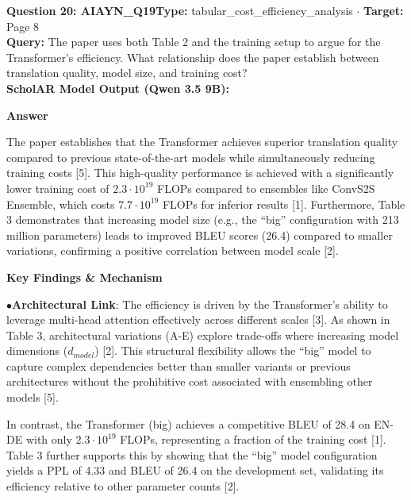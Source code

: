 \documentclass[10pt,a4paper]{article}
\begin{document}
\begin{tcolorbox}[questionbox]
{\noindent\bfseries\large\color{navy} Question 20: AIAYN\_Q19}\hfill {\footnotesize\color{darkteal}\textbf{Type:} tabular\_cost\_efficiency\_analysis $\cdot$ \textbf{Target:} Page 8}\\[4pt]
{\noindent\bfseries\color{accentblue} Query: } The paper uses both Table 2 and the training setup to argue for the Transformer's efficiency. What relationship does the paper establish between translation quality, model size, and training cost?\\[6pt]
{\noindent\bfseries\color{navy} ScholAR Model Output (Qwen 3.5 9B):}\\[2pt]
{\small \noindent \textbf{Answer}\par\vspace{3pt}The paper establishes that the Transformer achieves superior translation quality compared to previous state-of-the-art models while simultaneously reducing training costs [5].  This high-quality performance is achieved with a significantly lower training cost of $2.3 \cdot 10^{19}$ FLOPs compared to ensembles like ConvS2S Ensemble, which costs $7.7 \cdot 10^{19}$ FLOPs for inferior results [1]. Furthermore, Table 3 demonstrates that increasing model size (e.g., the ``big'' configuration with 213 million parameters) leads to improved BLEU scores (26.4) compared to smaller variations, confirming a positive correlation between model scale [2].\par\vspace{3pt}\noindent \textbf{Key Findings \& Mechanism}\par\vspace{3pt}\noindent\hspace*{8pt}$\bullet$\hspace*{4pt}\textbf{Architectural Link}: The efficiency is driven by the Transformer's ability to leverage multi-head attention effectively across different scales [3]. As shown in Table 3, architectural variations (A-E) explore trade-offs where increasing model dimensions ($d_{model}$) [2]. This structural flexibility allows the ``big'' model to capture complex dependencies better than smaller variants or previous architectures without the prohibitive cost associated with ensembling other models [5].\par\vspace{3pt}In contrast, the Transformer (big) achieves a competitive BLEU of 28.4 on EN-DE with only $2.3 \cdot 10^{19}$ FLOPs, representing a fraction of the training cost [1]. Table 3 further supports this by showing that the ``big'' model configuration yields a PPL of 4.33 and BLEU of 26.4 on the development set, validating its efficiency relative to other parameter counts [2].}\\[6pt]

\end{tcolorbox}
\end{document}
